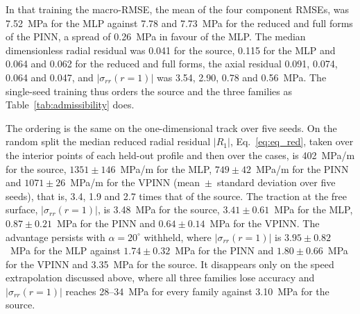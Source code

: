 \documentclass[pdflatex,sn-basic,Numbered]{sn-jnl}
\begin{document}
In that training the macro-RMSE, the mean of the four component RMSEs, was 7.52~MPa for the MLP against 7.78 and 7.73~MPa for the reduced and full forms of the PINN, a spread of 0.26~MPa in favour of the MLP. The median dimensionless radial residual was 0.041 for the source, 0.115 for the MLP and 0.064 and 0.062 for the reduced and full forms, the axial residual 0.091, 0.074, 0.064 and 0.047, and $|\sigma_{rr}(r{=}1)|$ was 3.54, 2.90, 0.78 and 0.56~MPa. The single-seed training thus orders the source and the three families as Table~\ref{tab:admissibility} does.

The ordering is the same on the one-dimensional track over five seeds.
On the random split the median reduced radial residual $|R_1|$, Eq.~\eqref{eq:eq_red}, taken over the interior points of each held-out profile and then over the cases, is 402~MPa/m for the source, $1351\pm146$~MPa/m for the MLP, $749\pm42$~MPa/m for the PINN and $1071\pm26$~MPa/m for the VPINN (mean~$\pm$~standard deviation over five seeds), that is, 3.4, 1.9 and 2.7 times that of the source. The traction at the free surface, $|\sigma_{rr}(r{=}1)|$, is 3.48~MPa for the source, $3.41\pm0.61$~MPa for the MLP, $0.87\pm0.21$~MPa for the PINN and $0.64\pm0.14$~MPa for the VPINN. The advantage persists with $\alpha=20^\circ$ withheld, where $|\sigma_{rr}(r{=}1)|$ is $3.95\pm0.82$~MPa for the MLP against $1.74\pm0.32$~MPa for the PINN and $1.80\pm0.66$~MPa for the VPINN and 3.35~MPa for the source. It disappears only on the speed extrapolation discussed above, where all three families lose accuracy and $|\sigma_{rr}(r{=}1)|$ reaches 28--34~MPa for every family against 3.10~MPa for the source.
\end{document}
